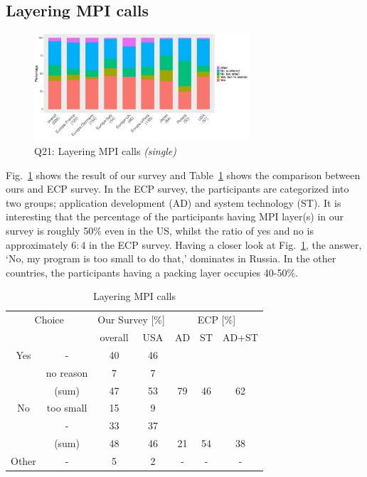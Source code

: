 \documentclass[conference,10pt,letterpaper]{IEEEtran}
\def\myquote#1{`#1'}
\begin{document}
\subsection{Layering MPI calls}

\begin{figure}[htb]
  \begin{center}
    \includegraphics[width=8cm]{R-scripts/Q21.pdf}
    \caption{Q21: Layering MPI calls {\it(single)}}
    \label{fig:layering-mpi-calls}
  \end{center}
\end{figure}

Fig.~\ref{fig:layering-mpi-calls} shows the result of our survey and
Table~\ref{tab:layering-mpi-calls} shows the comparison between ours
and ECP survey. In the ECP survey, the participants are categorized
into two groups; application development (AD) and system technology
(ST). It is interesting that the percentage of the participants having
MPI layer(s) in our survey is roughly 50\% even in the US, whilst the
ratio of yes and no is approximately $6:4$ in the ECP survey.
Having a closer look at Fig.~\ref{fig:layering-mpi-calls}, the answer,
\myquote{No, my program is too small to do that,} dominates in Russia. In
the other countries, the participants having a packing layer occupies
40-50\%. 

\begin{table}[htb]%
  \begin{center}%
    \caption{Layering MPI calls}\label{tab:layering-mpi-calls}%
    \begin{tabular}{c|c||c|c||c|c|c}%
      \hline%
      \multicolumn{2}{c||}{Choice} & \multicolumn{2}{c||}{Our Survey [\%]} &
      \multicolumn{3}{c}{ECP [\%]} \\
      \cline{3-7}%
      \multicolumn{2}{c||}{} & overall & USA & AD & ST & AD+ST \\
      \hline%
      \hline%
      Yes & - & 40 & 46 & & & \\
      & no reason & 7 & 7 & & & \\
      \cline{2-4}%
      & (sum) & 47 & 53 &  79 & 46 & 62 \\
      \hline%
      \hline%
      No & too small & 15 & 9 & & & \\
      & - & 33 & 37 & & & \\
      \cline{2-4}%
      & (sum) & 48 & 46 & 21 & 54 & 38 \\
      \hline%
      Other & - & 5 & 2 & - & - & - \\
      \hline%
    \end{tabular}%
  \end{center}%
\end{table}%
\end{document}
